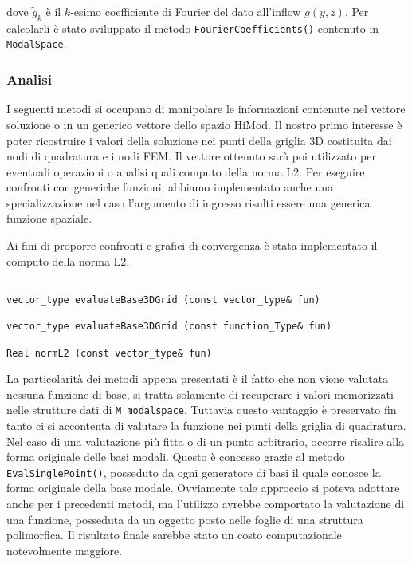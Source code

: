 dove $\tilde g_k$ \`e il $k$-esimo coefficiente di Fourier del dato all'inflow $g(y,z)$.
Per calcolarli \`e stato sviluppato 
il metodo \texttt{FourierCoefficients()} contenuto in \texttt{ModalSpace}.
\clearpage
\subsubsection{Analisi}

I seguenti metodi si occupano di manipolare le informazioni contenute nel vettore soluzione o in un generico vettore dello spazio HiMod. Il nostro primo interesse \`e poter ricostruire i valori della soluzione nei punti della griglia 
3D costituita dai nodi di quadratura e i nodi FEM. Il vettore ottenuto sar\`a poi utilizzato per eventuali operazioni o analisi quali computo 
della norma L2.
Per eseguire confronti con generiche funzioni, abbiamo implementato anche una specializzazione nel caso l'argomento di ingresso risulti essere 
una generica funzione spaziale.

Ai fini di proporre confronti e grafici di convergenza \`e stata implementato il computo della norma L2.

\begin{lstlisting}[style = general,frame=none]

vector_type evaluateBase3DGrid (const vector_type& fun)

vector_type evaluateBase3DGrid (const function_Type& fun)

Real normL2 (const vector_type& fun)

\end{lstlisting}

La particolarit\`a dei metodi appena presentati \`e il fatto che non viene valutata nessuna funzione di base, si tratta solamente di recuperare i valori 
memorizzati nelle strutture dati di \texttt{M\_modalspace}. Tuttavia questo vantaggio \`e preservato fin tanto ci si accontenta di valutare la 
funzione nei punti della griglia di quadratura. Nel caso di una valutazione pi\`u fitta o di un punto arbitrario, occorre risalire alla forma 
originale delle basi modali. Questo \`e concesso grazie al metodo \texttt{EvalSinglePoint()}, posseduto da ogni generatore di basi il quale 
conosce la forma originale della base modale. Ovviamente tale approccio si poteva 
adottare anche per i precedenti metodi, ma l'utilizzo avrebbe comportato la valutazione di una funzione, posseduta da un oggetto posto nelle 
foglie di una struttura polimorfica. Il risultato finale sarebbe stato un costo computazionale notevolmente maggiore.


